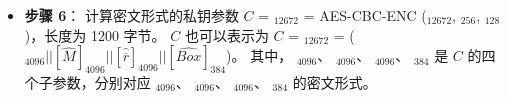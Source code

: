 \documentclass[main\_\_CN.tex]{subfiles}
\begin{document}
\begin{itemize}
    \item {\bfseries 步骤 6}：
            计算密文形式的私钥参数 \begin{math}C\end{math} = \begin{math}[C]_{12672}\end{math} =
            AES-CBC-ENC (\begin{math}[P]_{12672}\end{math}, \begin{math}[RSA\_DS\_KEY]_{256}\end{math}, \begin{math}[IV]_{128}\end{math})，长度为 1200 字节。
            \begin{math}C\end{math} 也可以表示为
            \begin{math}C\end{math} = \begin{math}[C]_{12672}\end{math} =
            (\begin{math}
            [\widehat{Y}]_{4096} ||
            [\widehat{M}]_{4096} ||
            [\widehat{ \overline{r} }]_{4096} ||
            [\widehat{Box}]_{384}
            \end{math})。
            其中，
            \begin{math} [\widehat{Y}]_{4096} \end{math}、
            \begin{math} [\widehat{M}]_{4096} \end{math}、
            \begin{math} [\widehat{ \overline{r} }]_{4096} \end{math}、
            \begin{math} [\widehat{Box}]_{384} \end{math}
            是 \begin{math}C\end{math} 的四个子参数，分别对应
            \begin{math} [Y]_{4096} \end{math}、
            \begin{math} [M]_{4096} \end{math}、
            \begin{math} [\overline{r}]_{4096} \end{math}、
            \begin{math} [Box]_{384} \end{math}
            的密文形式。

\end{itemize}
\end{document}
